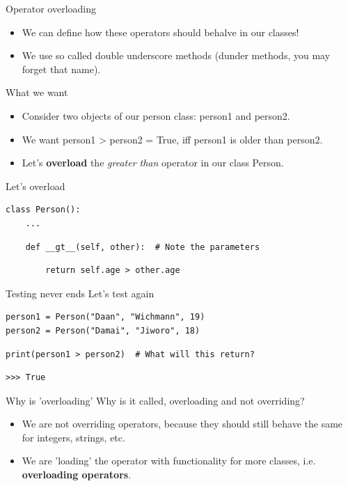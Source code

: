 \begin{frame}{Operator overloading}
\begin{itemize}
    \item We can define how these operators should behalve in our classes!
    \pause
    \item We use so called double underscore methods (dunder methods, you may forget that name).
\end{itemize}
\end{frame}

\begin{frame}{What we want}
\begin{itemize}
    \item Consider two objects of our person class: person1 and person2.
    \pause
    \item We want person1 > person2 = True, iff person1 is older than person2.
    \pause
    \item Let's \textbf{overload} the \textit{greater than} operator in our class Person.
\end{itemize}
\end{frame}

\begin{frame}[fragile]{Let's overload}
\begin{verbatim}
class Person():
    ...
\end{verbatim}
\pause
\begin{verbatim}
    def __gt__(self, other):  # Note the parameters
\end{verbatim}
\pause
\begin{verbatim}
        return self.age > other.age
\end{verbatim}
\end{frame}

\begin{frame}[fragile]{Testing never ends}
Let's test again
\pause
\begin{verbatim}
person1 = Person("Daan", "Wichmann", 19)
person2 = Person("Damai", "Jiworo", 18)
\end{verbatim}
\pause
\begin{verbatim}
print(person1 > person2)  # What will this return?
\end{verbatim}
\pause
\begin{verbatim}
>>> True
\end{verbatim}
\end{frame}

\begin{frame}{Why is 'overloading'}
    Why is it called, overloading and not overriding?
    \begin{itemize}
        \pause
        \item We are not overriding operators, because they should still behave the same for integers, strings, etc.
        \pause
        \item We are 'loading' the operator  with functionality for more classes, i.e. \textbf{overloading operators}.
    \end{itemize}
\end{frame}